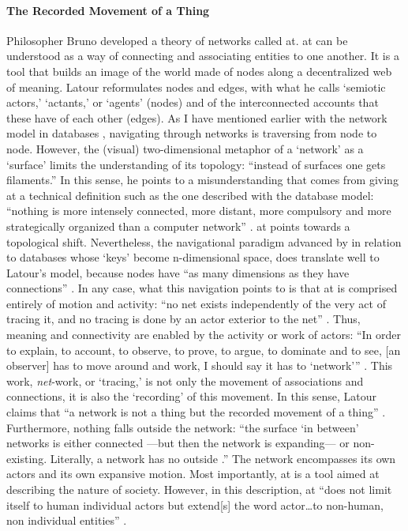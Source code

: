\paragraph{The Recorded Movement of a Thing}
Philosopher Bruno \textcite{Lat90:On, Lat93:We} developed a theory of networks called \gls{at}. \gls{at} can be understood as a way of connecting and associating entities to one another. It is a tool that builds an image of the world made of nodes along a decentralized web of meaning. Latour reformulates nodes and edges, with what he calls `semiotic actors,' `actants,' or `agents' (nodes) and of the interconnected accounts that these have of each other (edges). As I have mentioned earlier with the network model in databases , navigating through networks is traversing from node to node. However, the (visual) two-dimensional metaphor of a `network' as a `surface' limits the understanding of its topology: ``instead of surfaces one gets filaments.'' \parencite[3]{Lat90:On} In this sense, he points to a misunderstanding that comes from giving \gls{at} a technical definition such as the one described with the database model: ``nothing is more intensely connected, more distant, more compulsory and more strategically organized than a computer network'' \parencite[2]{Lat90:On}. \gls{at} points towards a topological shift. Nevertheless, the navigational paradigm advanced by \textcite{Bachman:1973:PN:355611.362534} in relation to databases whose `keys' become n-dimensional space, does translate well to Latour's model, because nodes have ``as many dimensions as they have connections'' \parencite[3]{Lat90:On}. In any case, what this navigation points to is that \gls{at} is comprised entirely of motion and activity: ``no net exists independently of the very act of tracing it, and no tracing is done by an actor exterior to the net'' \parencite[14]{Lat90:On}. Thus, meaning and connectivity are enabled by the activity or work of actors: ``In order to explain, to account, to observe, to prove, to argue, to dominate and to see, [an observer] has to move around and work, I should say it has to `network''' \parencite[13]{Lat90:On}. This work, \textit{net}-work, or `tracing,' is not only the movement of associations and connections, it is also the `recording' of this movement. In this sense, Latour claims that ``a network is not a thing but the recorded movement of a thing'' \parencite[14]{Lat90:On}. Furthermore, nothing falls outside the network: ``the surface `in between' networks is either connected ---but then the network is expanding--- or non-existing. Literally, a network has no outside \parencite[6]{Lat90:On}.'' The network encompasses its own actors and its own expansive motion. Most importantly, \gls{at} is a tool aimed at describing the nature of society. However, in this description, \gls{at} ``does not limit itself to human individual actors but extend[s] the word actor\dots to non-human, non individual entities'' \parencite[2]{Lat90:On}.

